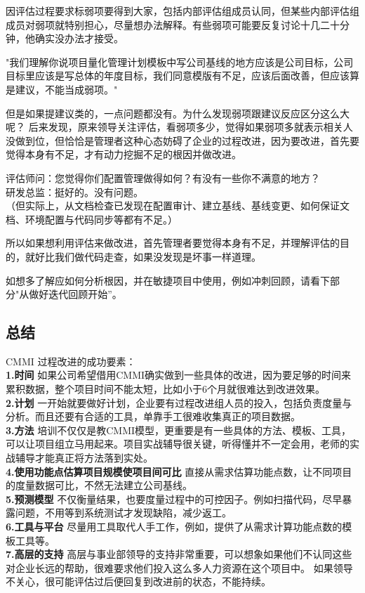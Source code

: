 因评估过程要求标弱项要得到大家，包括内部评估组成员认同，但某些内部评估组成员对弱项就特别担心，尽量想办法解释。有些弱项可能要反复讨论十几二十分钟，他确实没办法才接受。

"我们理解你说项目量化管理计划模板中写公司基线的地方应该是公司目标，公司目标里应该是写总体的年度目标，我们同意模版有不足，应该后面改善，但应该算是建议，不能当成弱项。"

但是如果提建议类的，一点问题都没有。为什么发现弱项跟建议反应区分这么大呢？
后来发现，原来领导关注评估，看弱项多少，觉得如果弱项多就表示相关人没做到位，但恰恰是管理者这种心态妨碍了企业的过程改进，因为要改进，首先要觉得本身有不足，才有动力挖掘不足的根因并做改进。

评估师问：您觉得你们配置管理做得如何？有没有一些你不满意的地方？\\
研发总监：挺好的。没有问题。\\
（但实际上，从文档检查已发现在配置审计、建立基线、基线变更、如何保证文档、环境配置与代码同步等都有不足。）

所以如果想利用评估来做改进，首先管理者要觉得本身有不足，并理解评估的目的，就好比我们做代码走查，如果没发现是坏事一样道理。

如想多了解应如何分析根因，并在敏捷项目中使用，例如冲刺回顾，请看下部分"从做好迭代回顾开始”。


\hypertarget{ux9644ux4ef6ux6848ux4f8b}{%
\subsection{总结}\label{ux9644ux4ef6ux6848ux4f8b}}

CMMI 过程改进的成功要素：\\
\textbf{1.时间}
如果公司希望借用CMMI确实做到一些具体的改进，因为要足够的时间来累积数据，整个项目时间不能太短，比如小于6个月就很难达到改进效果。\\
\textbf{2.计划}
一开始就要做好计划，企业要有过程改进组人员的投入，包括负责度量与分析。而且还要有合适的工具，单靠手工很难收集真正的项目数据。\\
\textbf{3.方法}
培训不仅仅是教CMMI模型，更重要是有一些具体的方法、模板、工具，可以让项目组立马用起来。项目实战辅导很关键，听得懂并不一定会用，老师的实战辅导才能真正将方法落到实处。\\
\textbf{4.使用功能点估算项目规模使项目间可比}
直接从需求估算功能点数，让不同项目的度量数据可比，不然无法建立公司基线。\\
\textbf{5.预测模型}
不仅衡量结果，也要度量过程中的可控因子。例如扫描代码，尽早暴露问题，不用等到系统测试才发现缺陷，减少返工。\\
\textbf{6.工具与平台}
尽量用工具取代人手工作，例如，提供了从需求计算功能点数的模板工具等。\\
\textbf{7.高层的支持}
高层与事业部领导的支持非常重要，可以想象如果他们不认同这些对企业长远的帮助，很难要求他们投入这么多人力资源在这个项目中。
如果领导不关心，很可能评估过后便回复到改进前的状态，不能持续。


